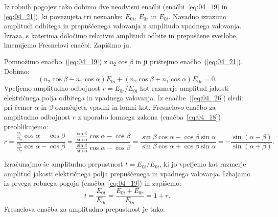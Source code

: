 Iz robnih
pogojev tako dobimo dve neodvisni enačbi (enačbi~\ref{eq:04_19} in \ref{eq:04_21}), 
ki povezujeta tri neznanke: $E_{0i}$, $E_{0r}$ in $E_{0t}$. Navadno izrazimo amplitudi
odbitega in prepuščenega valovanja z amplitudo vpadnega valovanja. Izraza, s katerima določimo 
relativni amplitudi odbite in prepuščene svetlobe, imenujemo Fresnelovi enačbi. Zapišimo ju.

Pomnožimo enačbo~(\ref{eq:04_19}) z $n_2 \cos \beta$ in ji prištejmo
enačbo~(\ref{eq:04_21}). Dobimo:
\begin{equation}
\left( n_2 \cos \beta-n_1 \cos \alpha\right) E_{0i} + 
\left( n_2 \cos \beta+n_1 \cos \alpha\right) E_{0r} = 0.
\label{eq:04_26}
\end{equation}
Vpeljemo amplitudno odbojnost $r = E_{0r}/E_{0i}$
kot razmerje amplitud jakosti električnega polja odbitega in vpadnega valovanja.
Iz enačbe~(\ref{eq:04_26}) sledi:
pri čemer $\alpha$ in $\beta$ označujeta vpadni in lomni kot. Fresnelovo enačbo za amplitudno odbojnost
$r$ z uporabo lomnega zakona (enačba~\ref{eq:04_18}) preoblikujemo:
\begin{equation}
r = \frac{\frac{n_1}{n_2} \cos \alpha - \cos \beta}{\frac{n_1}{n_2} \cos \alpha - \cos \beta} = 
\frac{\frac{\sin \beta}{\sin \alpha} \cos \alpha - \cos \beta}
{\frac{\sin \beta}{\sin \alpha} \cos \alpha - \cos \beta} = \frac{\sin \beta \cos \alpha -
\cos \beta \sin \alpha}{\sin \beta \cos \alpha + \cos \beta \sin \alpha} = 
-\frac{\sin (\alpha -\beta)}{\sin (\alpha + \beta)}.
\label{eq:04_27}
\end{equation}

Izračunajmo še amplitudno prepustnost $t = E_{0t}/E_{0i}$, ki jo vpeljemo
kot razmerje amplitud jakosti električnega polja prepuščenega in vpadnega valovanja. Izhajamo
iz prvega robnega pogoja (enačba~\ref{eq:04_19}) in zapišemo:
\begin{equation}
t = \frac{E_{0t}}{E_{0i}} = \frac{E_{0i} + E_{0r}}{E_{0i}} = 1+ r.
\label{eq:04_28}
\end{equation}
Fresnelova enačba za amplitudno prepustnost je tako:

